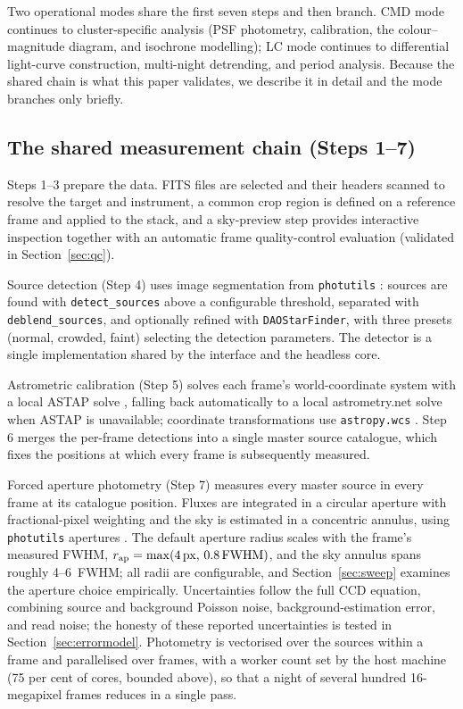 \documentclass[fleqn,usenatbib]{mnras}
\begin{document}
Two operational modes share the first seven steps and then branch. CMD mode continues to cluster-specific analysis (PSF photometry, calibration, the colour--magnitude diagram, and isochrone modelling); LC mode continues to differential light-curve construction, multi-night detrending, and period analysis. Because the shared chain is what this paper validates, we describe it in detail and the mode branches only briefly.

\subsection{The shared measurement chain (Steps 1--7)}
\label{sec:chain}

Steps 1--3 prepare the data. FITS files are selected and their headers scanned to resolve the target and instrument, a common crop region is defined on a reference frame and applied to the stack, and a sky-preview step provides interactive inspection together with an automatic frame quality-control evaluation (validated in Section~\ref{sec:qc}).

Source detection (Step 4) uses image segmentation from \texttt{photutils} \citep{photutils, astropy2022}: sources are found with \texttt{detect\_sources} above a configurable threshold, separated with \texttt{deblend\_sources}, and optionally refined with \texttt{DAOStarFinder}, with three presets (normal, crowded, faint) selecting the detection parameters. The detector is a single implementation shared by the interface and the headless core.

Astrometric calibration (Step 5) solves each frame's world-coordinate system with a local ASTAP solve \citep{astap}, falling back automatically to a local astrometry.net solve \citep{lang2010} when ASTAP is unavailable; coordinate transformations use \texttt{astropy.wcs} \citep{astropy2013}. Step 6 merges the per-frame detections into a single master source catalogue, which fixes the positions at which every frame is subsequently measured.

Forced aperture photometry (Step 7) measures every master source in every frame at its catalogue position. Fluxes are integrated in a circular aperture with fractional-pixel weighting and the sky is estimated in a concentric annulus, using \texttt{photutils} apertures \citep{photutils}. The default aperture radius scales with the frame's measured FWHM, $r_{\rm ap} = \max(4\,{\rm px},\, 0.8\,{\rm FWHM})$, and the sky annulus spans roughly 4--6~FWHM; all radii are configurable, and Section~\ref{sec:sweep} examines the aperture choice empirically. Uncertainties follow the full CCD equation, combining source and background Poisson noise, background-estimation error, and read noise; the honesty of these reported uncertainties is tested in Section~\ref{sec:errormodel}. Photometry is vectorised over the sources within a frame and parallelised over frames, with a worker count set by the host machine (75 per cent of cores, bounded above), so that a night of several hundred 16-megapixel frames reduces in a single pass.
\end{document}
